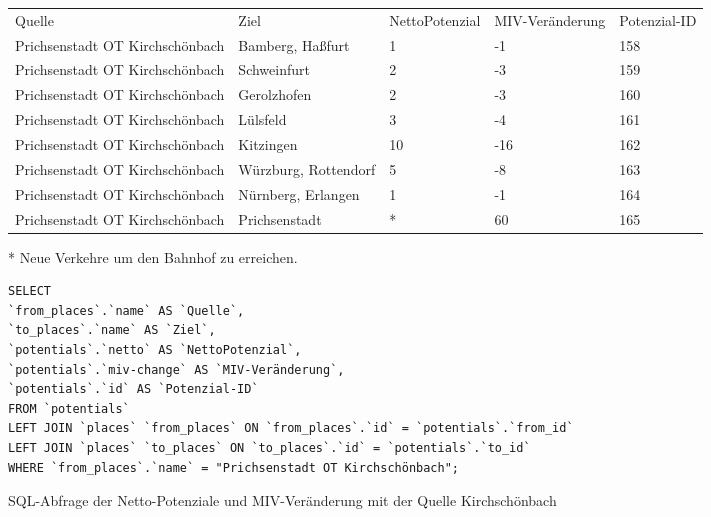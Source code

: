 \begin{tabularx}{\textwidth}{*5{X}}
Quelle & Ziel & NettoPotenzial & MIV-Veränderung & Potenzial-ID\\ 
Prichsenstadt OT Kirchschönbach & Bamberg, Haßfurt & 1 & -1 & 158\\ 
Prichsenstadt OT Kirchschönbach & Schweinfurt & 2 & -3 & 159\\ 
Prichsenstadt OT Kirchschönbach & Gerolzhofen & 2 & -3 & 160\\ 
Prichsenstadt OT Kirchschönbach & Lülsfeld & 3 & -4 & 161\\ 
Prichsenstadt OT Kirchschönbach & Kitzingen & 10 & -16 & 162\\ 
Prichsenstadt OT Kirchschönbach & Würzburg, Rottendorf & 5 & -8 & 163\\ 
Prichsenstadt OT Kirchschönbach & Nürnberg, Erlangen & 1 & -1 & 164\\ 
Prichsenstadt OT Kirchschönbach & Prichsenstadt & * & 60 & 165\\ 
\end{tabularx}
\newline
\newline
* Neue Verkehre um den Bahnhof zu erreichen.
\newline
\begin{listing}[htbp]
\begin{verbatim}
SELECT
`from_places`.`name` AS `Quelle`, 
`to_places`.`name` AS `Ziel`, 
`potentials`.`netto` AS `NettoPotenzial`, 
`potentials`.`miv-change` AS `MIV-Veränderung`, 
`potentials`.`id` AS `Potenzial-ID`
FROM `potentials`
LEFT JOIN `places` `from_places` ON `from_places`.`id` = `potentials`.`from_id`
LEFT JOIN `places` `to_places` ON `to_places`.`id` = `potentials`.`to_id`
WHERE `from_places`.`name` = "Prichsenstadt OT Kirchschönbach";
\end{verbatim}
\caption{SQL-Abfrage der Netto-Potenziale und MIV-Veränderung mit der Quelle Kirchschönbach}\label{lst-fz-kirchschoenbach}
\end{listing}